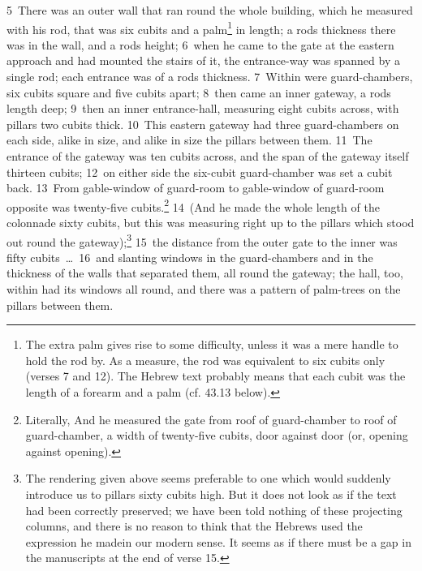\documentclass[10pt]{book} %
\begin{document}
\textcolor{benred8}{5}~There was an outer wall that ran round the whole building, which he measured with his rod, that was six cubits and a palm\footnote[2]{The extra palm gives rise to some difficulty, unless it was a mere handle to hold the rod by. As a measure, the rod was equivalent to six cubits only (verses 7 and 12). The Hebrew text probably means that each cubit was the length of a forearm and a palm (cf. 43.13 below).} in length; a rod\textquotesingle s thickness there was in the wall, and a rod\textquotesingle s height; \textcolor{benred8}{6}~when he came to the gate at the eastern approach and had mounted the stairs of it, the entrance-way was spanned by a single rod; each entrance was of a rod\textquotesingle s thickness. \textcolor{benred8}{7}~Within were guard-chambers, six cubits square and five cubits apart; \textcolor{benred8}{8}~then came an inner gateway, a rod\textquotesingle s length deep; \textcolor{benred8}{9}~then an inner entrance-hall, measuring eight cubits across, with pillars two cubits thick. \textcolor{benred8}{10}~This eastern gateway had three guard-chambers on each side, alike in size, and alike in size the pillars between them. \textcolor{benred8}{11}~The entrance of the gateway was ten cubits across, and the span of the gateway itself thirteen cubits; \textcolor{benred8}{12}~on either side the six-cubit guard-chamber was set a cubit back. \textcolor{benred8}{13}~From gable-window of guard-room to gable-window of guard-room opposite was twenty-five cubits.\footnote[3]{Literally, \textasciigrave And he measured the gate from roof of guard-chamber to roof of guard-chamber, a width of twenty-five cubits, door against door (or, opening against opening)\textquotesingle .} \textcolor{benred8}{14}~(And he made the whole length of the colonnade sixty cubits, but this was measuring right up to the pillars which stood out round the gateway);\footnote[4]{The rendering given above seems preferable to one which would suddenly introduce us to pillars sixty cubits high. But it does not look as if the text had been correctly preserved; we have been told nothing of these projecting columns, and there is no reason to think that the Hebrews used the expression \textasciigrave he made\textquotesingle  in our modern sense. It seems as if there must be a gap in the manuscripts at the end of verse 15.} \textcolor{benred8}{15}~the distance from the outer gate to the inner was fifty cubits~\ldots\  \textcolor{benred8}{16}~and slanting windows in the guard-chambers and in the thickness of the walls that separated them, all round the gateway; the hall, too, within had its windows all round, and there was a pattern of palm-trees on the pillars between them.
\end{document}

